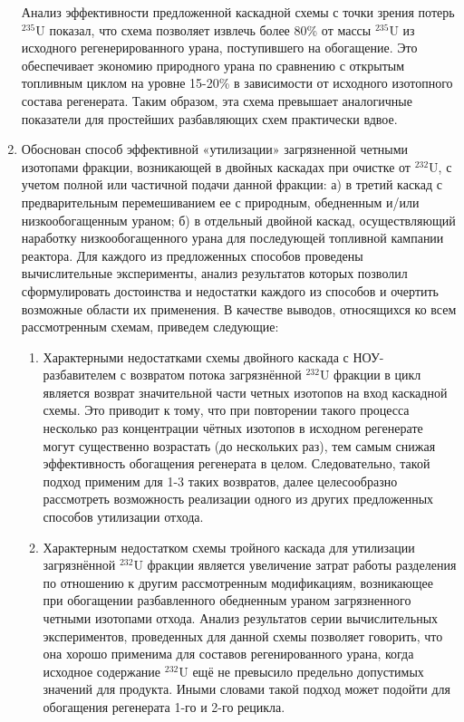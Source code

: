 \begin{enumerate}
Анализ эффективности предложенной каскадной схемы с точки зрения потерь $^{235}$U показал, что схема позволяет извлечь более 80\% от массы $^{235}$U из исходного регенерированного урана, поступившего на обогащение. Это обеспечивает экономию природного урана по сравнению с открытым топливным циклом на уровне 15-20\% в зависимости от исходного изотопного состава регенерата. Таким образом, эта схема превышает аналогичные показатели для простейших разбавляющих схем практически вдвое.
  \item Обоснован способ эффективной «утилизации» загрязненной четными изотопами фракции, возникающей в двойных каскадах при очистке от $^{232}$U, с учетом полной или частичной подачи данной фракции: а) в третий каскад с предварительным перемешиванием ее с природным, обедненным и/или низкообогащенным ураном; б) в отдельный двойной каскад, осуществляющий наработку низкообогащенного урана для последующей топливной кампании реактора. Для каждого из предложенных способов проведены вычислительные эксперименты, анализ результатов которых позволил сформулировать достоинства и недостатки каждого из способов и очертить возможные области их применения. 
В качестве выводов, относящихся ко всем рассмотренным схемам, приведем следующие:
\begin{enumerate}
  \item Характерными недостатками схемы двойного каскада с НОУ-разбавителем с возвратом потока загрязнённой $^{232}$U фракции в цикл является возврат значительной части четных изотопов на вход каскадной схемы. Это приводит к тому, что при повторении такого процесса несколько раз концентрации чётных изотопов в исходном регенерате могут существенно возрастать (до нескольких раз), тем самым снижая эффективность обогащения регенерата в целом. Следовательно, такой подход применим для 1-3 таких возвратов, далее целесообразно рассмотреть возможность реализации одного из других предложенных способов утилизации отхода.
  \item Характерным недостатком схемы тройного каскада для утилизации загрязнённой $^{232}$U фракции является увеличение затрат работы разделения по отношению к другим рассмотренным модификациям, возникающее при обогащении разбавленного обедненным ураном загрязненного четными изотопами отхода. Анализ результатов серии вычислительных экспериментов, проведенных для данной схемы позволяет говорить, что она хорошо применима для составов регенированного урана, когда исходное содержание $^{232}$U ещё не превысило предельно допустимых значений для продукта. Иными словами такой подход может подойти для обогащения регенерата 1-го и 2-го рецикла.

\end{enumerate}
\end{enumerate}

